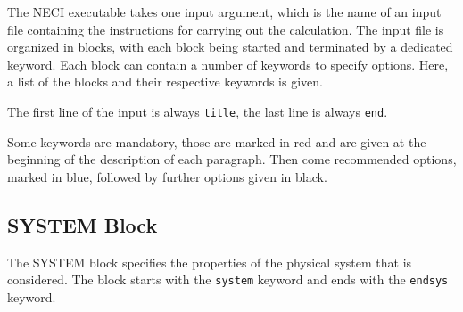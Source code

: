 \documentclass[a4paper,notitlepage]{scrreprt}
\begin{document}
The NECI executable takes one input argument, which is the name of an input
file containing the instructions for carrying out the calculation. The input
file is organized in blocks, with each block being started and terminated by a
dedicated keyword. Each block can contain a number of keywords to specify
options. Here, a list of the blocks and their respective keywords is given.

The first line of the input is always \texttt{title}, the last line is always
\texttt{end}.

Some keywords are mandatory, those are marked in \textcolor{mred}{red} and are
given at the beginning of the description of each paragraph. Then come
recommended options, marked in \textcolor{oblue}{blue}, followed by further
options given in black.

\subsection{SYSTEM Block}
The SYSTEM block specifies the properties of the physical system that is
considered. The block starts with the \texttt{system} keyword and ends with
the \texttt{endsys} keyword. 
\end{document}
